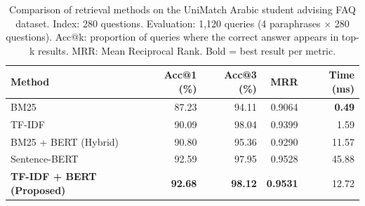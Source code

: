 
\begin{table}[h]
\centering
\caption{Comparison of retrieval methods on the UniMatch Arabic
student advising FAQ dataset. Index: 280 questions.
Evaluation: 1,120 queries (4 paraphrases $\times$ 280 questions).
Acc@k: proportion of queries where the correct answer
appears in top-k results. MRR: Mean Reciprocal Rank.
Bold = best result per metric.}
\label{tab:unimatch_results}
\begin{tabular}{lrrrr}
\hline
\textbf{Method} & \textbf{Acc@1 (\%)} & \textbf{Acc@3 (\%)}
& \textbf{MRR} & \textbf{Time (ms)} \\
\hline
BM25                    & 87.23          & 94.11          & 0.9064 & \textbf{0.49} \\
TF-IDF                  & 90.09          & 98.04          & 0.9399 & 1.59 \\
BM25 + BERT (Hybrid)    & 90.80          & 95.36          & 0.9290 & 11.57 \\
Sentence-BERT           & 92.59          & 97.95          & 0.9528 & 45.88 \\
\textbf{TF-IDF + BERT (Proposed)} & \textbf{92.68} & \textbf{98.12}
& \textbf{0.9531} & 12.72 \\
\hline
\end{tabular}
\end{table}
